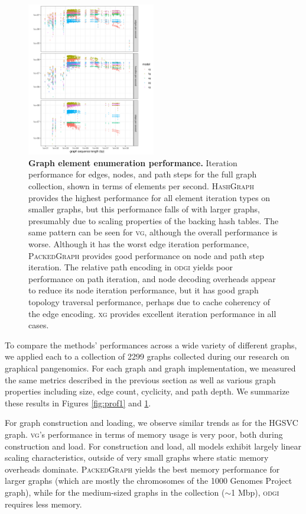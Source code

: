 \documentclass{bioinfo}
\begin{document}
\begin{figure}
  \centering
  \includegraphics[width=0.5\textwidth]{figures/iteration_per_second.png}
  \caption{
    \label{fig:prof2}
    \textbf{Graph element enumeration performance.}
    Iteration performance for edges, nodes, and path steps for the full graph collection, shown in terms of elements per second.
    \textsc{HashGraph} provides the highest performance for all element iteration types on smaller graphs, but this performance falls of with larger graphs, presumably due to scaling properties of the backing hash tables.
    The same pattern can be seen for \textsc{vg}, although the overall performance is worse.
    Although it has the worst edge iteration performance, \textsc{PackedGraph} provides good performance on node and path step iteration.
    The relative path encoding in \textsc{odgi} yields poor performance on path iteration, and node decoding overheads appear to reduce its node iteration performance, but it has good graph topology traversal performance, perhaps due to cache coherency of the edge encoding.
    \textsc{xg} provides excellent iteration performance in all cases.
    }
\end{figure}

To compare the methods' performances across a wide variety of different graphs, we applied each to a collection of 2299 graphs collected during our research on graphical pangenomics.
For each graph and graph implementation, we measured the same metrics described in the previous section as well as various graph properties including size, edge count, cyclicity, and path depth.
We summarize these results in Figures \ref{fig:prof1} and \ref{fig:prof2}.

For graph construction and loading, we observe similar trends as for the HGSVC graph.
\textsc{vg}'s performance in terms of memory usage is very poor, both during construction and load.
For construction and load, all models exhibit largely linear scaling characteristics, outside of very small graphs where static memory overheads dominate.
\textsc{PackedGraph} yields the best memory performance for larger graphs (which are mostly the chromosomes of the 1000 Genomes Project graph), while for the medium-sized graphs in the collection ($\sim$1 Mbp), \textsc{odgi} requires less memory.
\end{document}
